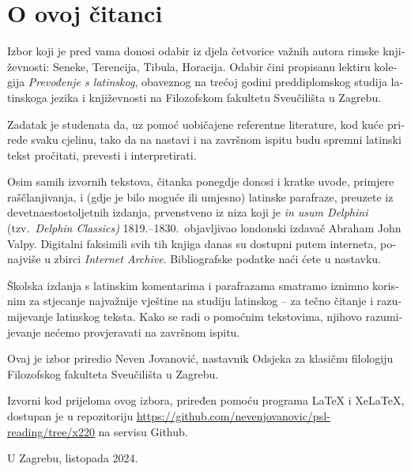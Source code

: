 \documentclass[a4paper,12pt,twoside]{book}
\begin{document}
\section*{O ovoj čitanci}
\begin{croatian}
  

Izbor koji je pred vama donosi odabir iz djela četvorice važnih autora rimske književnosti: Seneke, Terencija, Tibula, Horacija. Odabir čini propisanu lektiru kolegija \textit{Prevođenje s latinskog}, obaveznog na trećoj godini preddiplomskog studija latinskoga jezika i književnosti na Filozofskom fakultetu Sveučilišta u Zagrebu.

Zadatak je studenata da, uz pomoć uobičajene referentne literature, kod kuće prirede svaku cjelinu, tako da na nastavi i na završnom ispitu budu spremni latinski tekst pročitati, prevesti i interpretirati.


Osim samih izvornih tekstova, čitanka ponegdje donosi i kratke uvode, primjere raščlanjivanja, i (gdje je bilo moguće ili umjesno) latinske parafraze, preuzete iz devetnaestostoljetnih izdanja, prvenstveno iz niza koji je \textit{in usum Delphini} (tzv.\ \textit{Delphin Classics)} 1819.–1830.\ objavljivao londonski izdavač Abraham John Valpy. Digitalni faksimili svih tih knjiga danas su dostupni putem interneta, ponajviše u zbirci \textit{Internet Archive}. Bibliografske podatke naći ćete u nastavku. 

Školska izdanja s latinskim komentarima i parafrazama smatramo iznimno korisnim za stjecanje najvažnije vještine na studiju latinskog – za tečno čitanje i razumijevanje latinskog teksta. Kako se radi o pomoćnim tekstovima, njihovo razumijevanje nećemo provjeravati na završnom ispitu.

Ovaj je izbor priredio Neven Jovanović, nastavnik Odsjeka za klasičnu filologiju Filozofskog fakulteta Sveučilišta u Zagrebu.

Izvorni kod prijeloma ovog izbora, priređen pomoću programa LaTeX i XeLaTeX, dostupan je u repozitoriju \url{https://github.com/nevenjovanovic/psl-reading/tree/x220} na servisu Github.



\medskip

U Zagrebu, listopada 2024.

\end{croatian}
\end{document}
